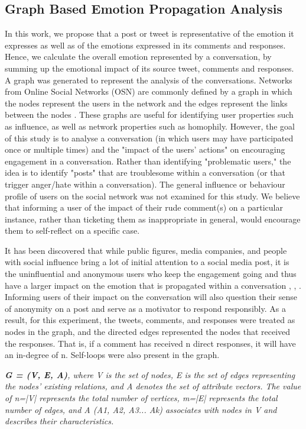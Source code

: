 \documentclass[acmtog]{acmart}
\begin{document}
\subsection{Graph Based Emotion Propagation Analysis}
In this work, we propose that a post or tweet is representative of the emotion it expresses as well as of the emotions expressed in its comments and responses. Hence, we calculate the overall emotion represented by a conversation, by summing up the emotional impact of its source tweet, comments and responses. A graph was generated to represent the analysis of the conversations. Networks from Online Social Networks (OSN) are commonly defined by a graph in which the nodes represent the users in the network and the edges represent the links between the nodes \cite{antonakaki2021survey}. These graphs are useful for identifying user properties such as influence, as well as network properties such as homophily. However, the goal of this study is to analyse a conversation (in which users may have participated once or multiple times) and the "impact of the users' actions" on encouraging engagement in a conversation. Rather than identifying "problematic users," the idea is to identify "posts" that are troublesome within a conversation (or that trigger anger/hate within a conversation). The general influence or behaviour profile of users on the social network was not examined for this study. We believe that informing a user of the impact of their rude comment(s) on a particular instance, rather than ticketing them as inappropriate in general, would encourage them to self-reflect on a specific case. 


It has been discovered that while public figures, media companies, and people with social influence bring a lot of initial attention to a social media post, it is the uninfluential and anonymous users who keep the engagement going and thus have a larger impact on the emotion that is propagated within a conversation \cite{solovev2022moral}, \cite{mirbabaie2021development}, \cite{saveski2021structure}. Informing users of their impact on the conversation will also question their sense of anonymity on a post and serve as a motivator to respond responsibly. As a result, for this experiment, the tweets, comments, and responses were treated as nodes in the graph, and the directed edges represented the nodes that received the responses. That is, if a comment has received n direct responses, it will have an in-degree of n. Self-loops were also present in the graph. 

\textit{\textbf{G = (V, E, A)}, where V is the set of nodes, E is the set of edges representing the nodes' existing relations, and A denotes the set of attribute vectors. The value of n=|V| represents the total number of vertices, m=|E| represents the total number of edges, and A (A1, A2, A3... Ak) associates with nodes in V and describes their characteristics.}
\end{document}
